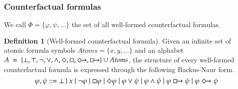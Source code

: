 \documentclass[a4paper,american]{paper}
\theoremstyle{definition}\newtheorem{definition}{Definition}
\begin{document}
\subsubsection{Counterfactual formulas}
We call $\Phi = \{\varphi ,\psi ,...\}$ the set of all well-formed counterfactual formulas.
\begin{definition}[Well-formed counterfactual formula]
Given an infinite set of atomic formula symbols $Atoms = \{ x, y, ...\}$ and an alphabet $A~=~\{\bot ,\top ,\neg ,\vee ,\wedge ,\Diamond ,\Box ,\Diamondright ,\boxright\}\cup Atoms$, the structure of every well-formed counterfactual formula is expressed through the following Backus-Naur form.
\begin{equation}
\varphi, \psi ::= \bot \mid x \mid \neg \varphi \mid \Box \varphi \mid \Diamond \varphi \mid \varphi \vee \psi \mid \varphi \wedge \psi \mid \varphi \boxright \psi \mid \varphi \Diamondright \psi
\end{equation}
\end{definition}
\end{document}
